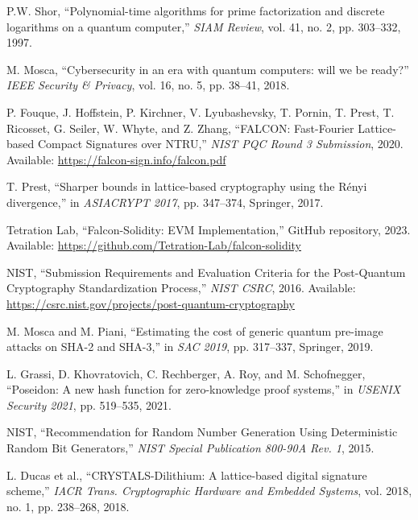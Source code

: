 \documentclass[11pt,a4paper]{article}
\begin{document}

\begin{thebibliography}{99}

P.W. Shor,
``Polynomial-time algorithms for prime factorization and discrete logarithms on a quantum computer,''
\textit{SIAM Review}, vol. 41, no. 2, pp. 303--332, 1997.

M. Mosca,
``Cybersecurity in an era with quantum computers: will we be ready?''
\textit{IEEE Security \& Privacy}, vol. 16, no. 5, pp. 38--41, 2018.

P. Fouque, J. Hoffstein, P. Kirchner, V. Lyubashevsky, T. Pornin, T. Prest, T. Ricosset, G. Seiler, W. Whyte, and Z. Zhang,
``FALCON: Fast-Fourier Lattice-based Compact Signatures over NTRU,''
\textit{NIST PQC Round 3 Submission}, 2020.
Available: \url{https://falcon-sign.info/falcon.pdf}

T. Prest,
``Sharper bounds in lattice-based cryptography using the R\'enyi divergence,''
in \textit{ASIACRYPT 2017}, pp. 347--374, Springer, 2017.

Tetration Lab,
``Falcon-Solidity: EVM Implementation,''
GitHub repository, 2023.
Available: \url{https://github.com/Tetration-Lab/falcon-solidity}

NIST,
``Submission Requirements and Evaluation Criteria for the Post-Quantum Cryptography Standardization Process,''
\textit{NIST CSRC}, 2016.
Available: \url{https://csrc.nist.gov/projects/post-quantum-cryptography}

M. Mosca and M. Piani,
``Estimating the cost of generic quantum pre-image attacks on SHA-2 and SHA-3,''
in \textit{SAC 2019}, pp. 317--337, Springer, 2019.

L. Grassi, D. Khovratovich, C. Rechberger, A. Roy, and M. Schofnegger,
``Poseidon: A new hash function for zero-knowledge proof systems,''
in \textit{USENIX Security 2021}, pp. 519--535, 2021.

NIST,
``Recommendation for Random Number Generation Using Deterministic Random Bit Generators,''
\textit{NIST Special Publication 800-90A Rev. 1}, 2015.

L. Ducas et al.,
``CRYSTALS-Dilithium: A lattice-based digital signature scheme,''
\textit{IACR Trans. Cryptographic Hardware and Embedded Systems}, vol. 2018, no. 1, pp. 238--268, 2018.


\end{thebibliography}
\end{document}
